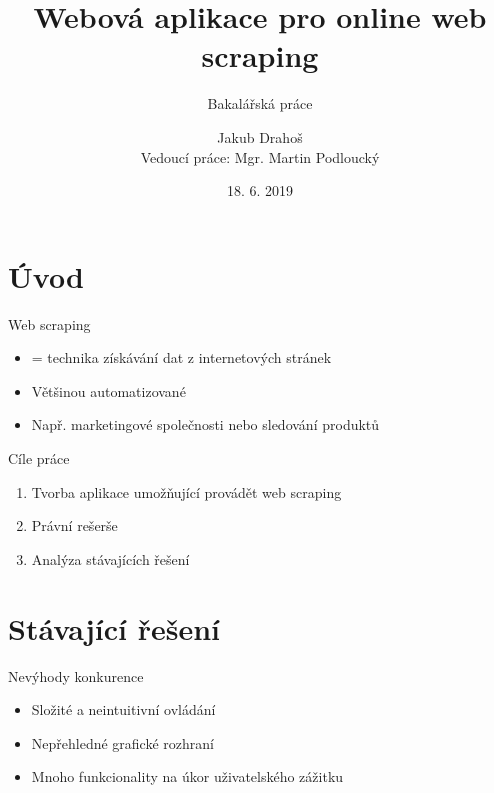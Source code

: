 \documentclass[czech,aspectratio=169]{beamer}
\title[Webová aplikace pro online web scraping]{Webová aplikace pro online web scraping}
\subtitle{Bakalářská práce}
\institute[FIT ČVUT v Praze]{Fakulta informačních technologií \\ České vysoké učení technické v Praze}
\author[J. Drahoš]{Jakub Drahoš \\ Vedoucí práce: Mgr. Martin Podloucký}
\date{18. 6. 2019}
\begin{document}
	\begin{frame}
		\titlepage
	\end{frame}

	\begin{frame}
		\tableofcontents
	\end{frame}
	
	
	\section{Úvod}
	\begin{frame}{Web scraping}
		\begin{itemize}
			\item = technika získávání dat z internetových stránek
			\item Většinou automatizované
			\item Např. marketingové společnosti nebo sledování produktů
		\end{itemize}
	\end{frame}

	\begin{frame}{Cíle práce}
		\begin{enumerate}
			\item Tvorba aplikace umožňující provádět web scraping
			\item Právní rešerše
			\item Analýza stávajících řešení
		\end{enumerate}
	\end{frame}

	
	\section{Stávající řešení}
	\begin{frame}{Nevýhody konkurence}
		\begin{itemize}
			\item Složité a neintuitivní ovládání
			\item Nepřehledné grafické rozhraní
			\item Mnoho funkcionality na úkor uživatelského zážitku
		\end{itemize}
	\end{frame}
\end{document}
